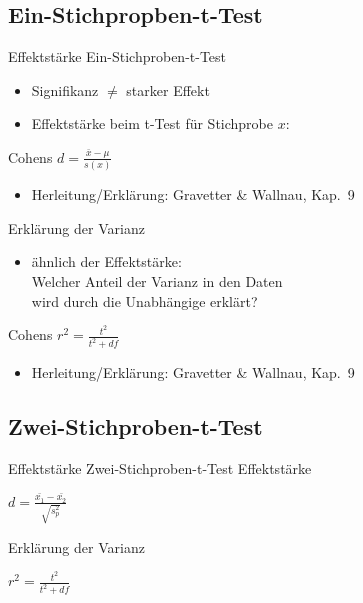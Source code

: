 \subsection{Ein-Stichpropben-t-Test}

\begin{frame}
  {Effektstärke Ein-Stichproben-t-Test}
  \begin{itemize}[<+->]
    \item Signifikanz $\neq$ starker Effekt
    \item Effektstärke beim t-Test für Stichprobe $x$:
  \end{itemize}
  \pause
  \begin{center}
    \alert{Cohens $d=\frac{\bar{x}-\mu}{s(x)}$}
  \end{center}
  \pause
  \begin{itemize}
    \item Herleitung\slash Erklärung: Gravetter \& Wallnau, Kap.\ 9
  \end{itemize}
\end{frame}

\begin{frame}
  {Erklärung der Varianz}
  \begin{itemize}
    \item ähnlich der Effektstärke: \\
      \alert{Welcher Anteil der Varianz in den Daten\\
      wird durch die Unabhängige erklärt?}
  \end{itemize}
  \pause
  \begin{center}
    \alert{Cohens $r^2=\frac{t^2}{t^2+df}$}
  \end{center}
  \pause
  \begin{itemize}
    \item Herleitung\slash Erklärung: Gravetter \& Wallnau, Kap.\ 9
  \end{itemize}
\end{frame}

\subsection{Zwei-Stichproben-t-Test}



\begin{frame}
  {Effektstärke Zwei-Stichproben-t-Test}
  Effektstärke
  \begin{center}
    $d=\frac{\bar{x_1}-\bar{x_2}}{\sqrt{s^2_p}}$
  \end{center}
  \pause
  Erklärung der Varianz
  \begin{center}
    $r^2=\frac{t^2}{t^2+df}$
  \end{center}
\end{frame}


